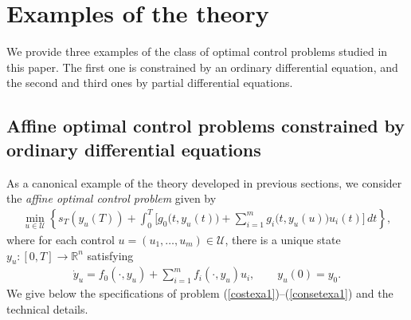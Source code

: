 \documentclass[hidelinks,onefignum,onetabnum]{siamart220329}
\begin{document}

\section{Examples of the theory}\label{Examples}
We provide three examples of the class of  optimal control problems studied in this paper. The first one is constrained by an ordinary differential equation, and the second and third ones by partial differential equations.









\subsection{Affine optimal control problems constrained by ordinary differential equations}
As a canonical example of the theory developed in previous sections, we consider the  \textit{affine optimal control  problem}  given by
\begin{align}\label{costexa1}
	\min_{u\in\mathcal U}\left\lbrace s_T(y_{u}(T))+\int_{0}^T\Big[g_0\big(t,y_{u}(t)\big)+\sum_{i=1}^m g_i\big(t,y_{u}(u)\big) u_i(t)\Big]\, dt \right\rbrace,
\end{align}
where  for each control $u=(u_1,\dots,u_m)\in\mathcal U$, there is a unique state $y_{u}:[0,T]\to\mathbb R^n$ satisfying
\begin{align}\label{consetexa1}
		\dot y_{u}=f_0(\cdot,y_{u})+\sum_{i=1}^m f_i(\cdot,y_{u}) u_i,
		\qquad
		y_u(0)=y_0 .
\end{align}
We give below the specifications of problem (\ref{costexa1})--(\ref{consetexa1})  and the  technical details.
\end{document}
